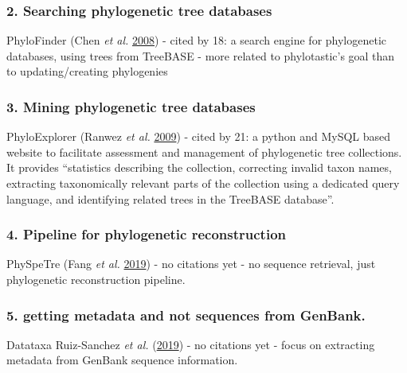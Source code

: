 \documentclass[]{article}
\begin{document}
\hypertarget{searching-phylogenetic-tree-databases}{%
\subsubsection{2. Searching phylogenetic tree databases}\label{searching-phylogenetic-tree-databases}}

PhyloFinder (Chen \emph{et al.} \protect\hyperlink{ref-chen2008phylofinder}{2008}) - cited by 18: a search engine for phylogenetic databases, using
trees from TreeBASE - more related to phylotastic's goal than to updating/creating phylogenies

\hypertarget{mining-phylogenetic-tree-databases}{%
\subsubsection{3. Mining phylogenetic tree databases}\label{mining-phylogenetic-tree-databases}}

PhyloExplorer (Ranwez \emph{et al.} \protect\hyperlink{ref-ranwez2009phyloexplorer}{2009}) - cited by 21: a python and MySQL based website to facilitate
assessment and management of phylogenetic tree collections. It provides ``statistics describing the collection,
correcting invalid taxon names, extracting taxonomically relevant parts of the collection
using a dedicated query language, and identifying related trees in the TreeBASE database''.

\hypertarget{pipeline-for-phylogenetic-reconstruction}{%
\subsubsection{4. Pipeline for phylogenetic reconstruction}\label{pipeline-for-phylogenetic-reconstruction}}

PhySpeTre (Fang \emph{et al.} \protect\hyperlink{ref-fang2019physpetree}{2019}) - no citations yet - no sequence retrieval, just phylogenetic reconstruction
pipeline.

\hypertarget{getting-metadata-and-not-sequences-from-genbank.}{%
\subsubsection{5. getting metadata and not sequences from GenBank.}\label{getting-metadata-and-not-sequences-from-genbank.}}

Datataxa Ruiz-Sanchez \emph{et al.} (\protect\hyperlink{ref-ruiz2019datataxa}{2019}) - no citations yet - focus on extracting metadata from GenBank sequence information.
\end{document}
